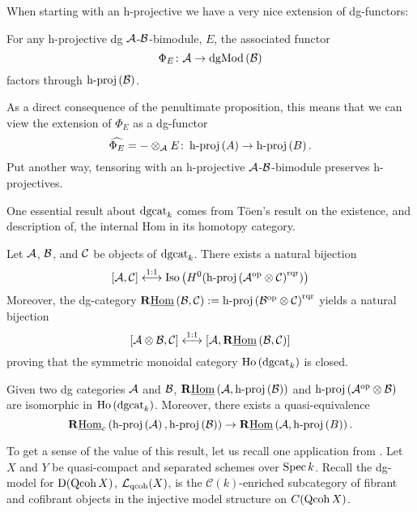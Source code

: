 When starting with an h-projective we have a very nice extension of dg-functors:
\begin{proposition}[{\parencite[Lemma 3.4]{CS15}}]
  For any h-projective dg \(\A\)-\(\B\)-bimodule, \(E\), the associated functor
  \[\Phi_E \colon \A \to \dgMod{\B}\]
  factors through \(\hproj{\B}\).
\end{proposition}

As a direct consequence of the penultimate proposition, this means that we can view the extension of \(\Phi_E\) as a dg-functor
\[\widehat{\Phi_E} = - \otimes_\A E \colon \hproj{A} \to \hproj{B}.\]
Put another way, tensoring with an h-projective \(\A\)-\(\B\)-bimodule preserves h-projectives.

One essential result about \(\dgcat{k}\) comes from T\"oen's result on the existence, and description of, the internal Hom in its homotopy category. 

\begin{theorem} \label{theorem: Toen}
  Let \(\A\), \(\B\), and \(\C\) be objects of \(\dgcat{k}\).
  There exists a natural bijection
  \[[\A,\C] \overset{1:1}\longleftrightarrow \Iso{H^0(\hproj{\A^{\opp} \otimes \C}^\rqr)}\]
  Moreover, the dg-category \(\RHom{\B,\C} := \hproj{\B^\opp \otimes \C}^\rqr\) yields a natural bijection
  \[[\A \otimes \B, \C] \overset{1:1}\longleftrightarrow [\A, \RHom{\B,\C}]\]
  proving that the symmetric monoidal category \(\Ho{\dgcat{k}}\) is closed.
\end{theorem}

\begin{corollary} \label{corollary: Toen}
  Given two dg categories \(\A\) and \(\B\), \(\RHom{\A, \hproj{\B}}\) and \(\hproj{\A^\opp \otimes \B}\) are isomorphic in \(\Ho{\dgcat{k}}\).
  Moreover, there exists a quasi-equivalence
  \[\RHomc{\hproj{\A},\hproj{\B}} \to \RHom{\A, \hproj{B}}.\]
\end{corollary}

To get a sense of the value of this result, let us recall one application from \parencite[Section 8.3]{Toen07}. Let \(X\) and \(Y\) be quasi-compact and separated schemes over \(\op{Spec} k\). 
Recall the dg-model for \(\mathrm{D}(\op{Qcoh} X)\), \(\mathcal L_{\op{qcoh}}(X)\), is the \(\mathcal C(k)\)-enriched subcategory of fibrant and cofibrant objects in the injective model structure on \(C(\op{Qcoh} X)\).

